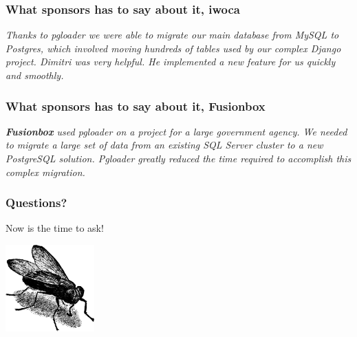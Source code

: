 \documentclass{beamer}
\begin{document}
\begin{frame}
  \frametitle{What sponsors has to say about it, \textbf{iwoca}}

  \textit{\Large Thanks to pgloader we were able to migrate our main database from
    MySQL to Postgres, which involved moving hundreds of tables used by our
    complex Django project. Dimitri was very helpful. He implemented a new
    feature for us quickly and smoothly.
  }
  \vfill
\end{frame}

\begin{frame}
  \frametitle{What sponsors has to say about it, \textbf{Fusionbox}}

  \textit{\LARGE \textbf{Fusionbox} used pgloader on a project for a large
    government agency. We needed to migrate a large set of data from an
    existing SQL Server cluster to a new PostgreSQL solution. Pgloader
    greatly reduced the time required to accomplish this complex migration.
  }
  \vfill
\end{frame}

\begin{frame}
  \frametitle{Questions?}

  \begin{center}
    Now is the time to ask!
    \vfill

    \includegraphics[height=9em]{fly.png}
  \end{center}
\end{frame}
\end{document}
